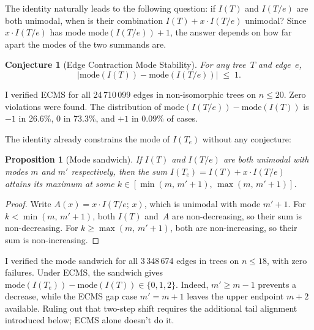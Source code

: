 \documentclass[12pt,oneside]{article}
\newtheorem{conjecture}[theorem]{Conjecture}
\newtheorem{proposition}[theorem]{Proposition}
\theoremstyle{remark}
\begin{document}
The identity naturally leads to the following question: if $I(T)$ and $I(T/e)$ are both unimodal, when is their combination $I(T) + x \cdot I(T/e)$ unimodal?
Since $x \cdot I(T/e)$ has mode $\mathrm{mode}(I(T/e)) + 1$, the answer depends on how far apart the modes of the two summands are.

\begin{conjecture}[Edge Contraction Mode Stability]\label{conj:ecms}
  For any tree~$T$ and edge~$e$,
  \[
    \bigl|\mathrm{mode}(I(T)) - \mathrm{mode}(I(T/e))\bigr| \;\le\; 1.
  \]
\end{conjecture}

I verified ECMS for all 24\,710\,099 edges in non-isomorphic trees on $n \le 20$.
Zero violations were found.
The distribution of $\mathrm{mode}(I(T/e)) - \mathrm{mode}(I(T))$ is $-1$ in 26.6\%, $0$ in 73.3\%, and $+1$ in 0.09\% of cases.

The identity already constrains the mode of $I(T_e)$ without any conjecture:

\begin{proposition}[Mode sandwich]\label{prop:sandwich}
  If $I(T)$ and $I(T/e)$ are both unimodal with modes $m$ and $m'$ respectively,
  then the sum $I(T_e) = I(T) + x \cdot I(T/e)$ attains its maximum at some
  $k \in [\min(m,\, m'{+}1),\, \max(m,\, m'{+}1)]$.
\end{proposition}

\begin{proof}
  Write $A(x) = x \cdot I(T/e;\, x)$, which is unimodal with mode $m'{+}1$.
  For $k < \min(m,\, m'{+}1)$, both $I(T)$ and~$A$ are non-decreasing, so their sum is non-decreasing.
  For $k \ge \max(m,\, m'{+}1)$, both are non-increasing, so their sum is non-increasing.
\end{proof}

I verified the mode sandwich for all 3\,348\,674 edges in trees on $n \le 18$, with zero failures.
Under ECMS, the sandwich gives
$\mathrm{mode}(I(T_e)) - \mathrm{mode}(I(T)) \in \{0,1,2\}$.
Indeed, $m'\ge m-1$ prevents a decrease, while the ECMS gap case $m'=m+1$ leaves the upper endpoint $m+2$ available.
Ruling out that two-step shift requires the additional tail alignment introduced below; ECMS alone doesn't do it.
\end{document}
